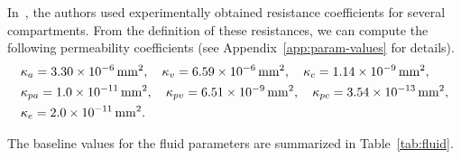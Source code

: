 \documentclass[10pt]{article}
\newcommand{\1}{^{(1)}}
\newcommand{\2}{^{(2)}}
\begin{document}

In~\cite{Vinje-2020-ICP}, the authors used experimentally obtained resistance coefficients for several compartments. From the definition of these resistances, we can compute the following permeability coefficients (see Appendix~\ref{app:param-values} for details). 
\[
\begin{aligned}
    &\kappa_{a} = 3.30 \times 10^{-6} \, \text{\si{mm^2}},\quad \kappa_v = 6.59\times 10^{-6} \, \text{\si{mm^2}},\quad \kappa_{c}  = 1.14\times 10^{-9} \, \text{\si{mm^2}},\\
    &\kappa_{pa} =  1.0\times 10^{-11}\, \text{\si{mm^2}},\quad \kappa_{pv} = 6.51\times 10^{-9}\, \text{\si{mm^2}},\quad \kappa_{pc}  = 3.54 \times 10^{-13}\,\text{\si{mm^2}}, \\
    &\kappa_e = 2.0\times 10^{-11} \, \text{\si{mm^2}}.
    \end{aligned}
\]

The baseline values for the fluid parameters are summarized in Table~\ref{tab:fluid}.
\end{document}

